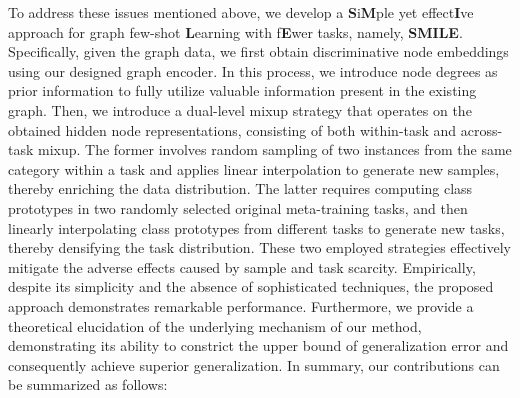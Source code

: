 To address these issues mentioned above, we develop a \textbf{S}i\textbf{M}ple yet effect\textbf{I}ve approach for graph few-shot \textbf{L}earning with f\textbf{E}wer tasks, namely, \textbf{SMILE}. %
Specifically, given the graph data, we first obtain discriminative node embeddings using our designed graph encoder. In this process, we introduce node degrees as prior information to fully utilize valuable information present in the existing graph. Then, we introduce a dual-level mixup strategy that operates on the obtained hidden node representations, consisting of both within-task and across-task mixup. The former involves random sampling of two instances from the same category within a task and applies linear interpolation to generate new samples, thereby enriching the data distribution. The latter requires computing class prototypes in two randomly selected original meta-training tasks, and then linearly interpolating class prototypes from different tasks to generate new tasks, thereby densifying the task distribution. %
These two employed strategies effectively mitigate the adverse effects caused by sample and task scarcity. %
Empirically, despite its simplicity and the absence of sophisticated techniques, the proposed approach demonstrates remarkable performance. %
Furthermore, we provide a theoretical elucidation of the underlying mechanism of our method, demonstrating its ability to constrict the upper bound of generalization error and consequently achieve superior generalization. %
In summary, our contributions can be summarized as follows:

